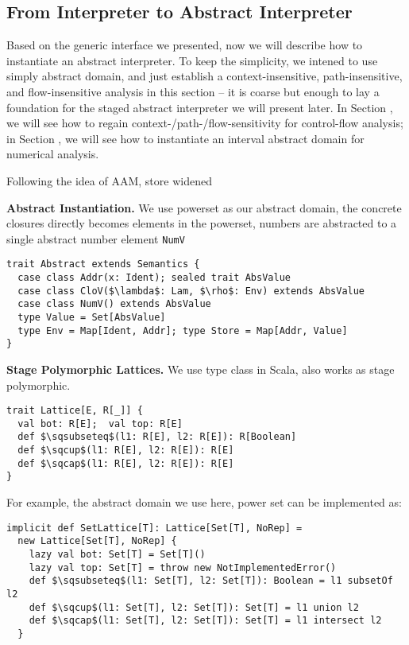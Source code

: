 \subsection{From Interpreter to Abstract Interpreter}

Based on the generic interface we presented, now we will describe how to instantiate an abstract interpreter.
To keep the simplicity, we intened to use simply abstract domain, and just establish a context-insensitive, 
path-insensitive, and flow-insensitive analysis in this section -- it is coarse but enough to lay a foundation for 
the staged abstract interpreter we will present later.
In Section , we will see how to regain 
context-/path-/flow-sensitivity for control-flow analysis; in Section , we will see how to 
instantiate an interval abstract domain for numerical analysis.

Following the idea of AAM, store widened

\textbf{Abstract Instantiation.}
We use powerset as our abstract domain, the concrete closures directly becomes elements in the powerset, numbers
are abstracted to a single abstract number element \texttt{NumV}

\begin{lstlisting}
trait Abstract extends Semantics {
  case class Addr(x: Ident); sealed trait AbsValue
  case class CloV($\lambda$: Lam, $\rho$: Env) extends AbsValue
  case class NumV() extends AbsValue
  type Value = Set[AbsValue]
  type Env = Map[Ident, Addr]; type Store = Map[Addr, Value]
}
\end{lstlisting}

\textbf{Stage Polymorphic Lattices.}
We use type class in Scala, also works as stage polymorphic.
\begin{lstlisting}
trait Lattice[E, R[_]] {
  val bot: R[E];  val top: R[E]
  def $\sqsubseteq$(l1: R[E], l2: R[E]): R[Boolean]
  def $\sqcup$(l1: R[E], l2: R[E]): R[E]
  def $\sqcap$(l1: R[E], l2: R[E]): R[E]
}
\end{lstlisting}

For example, the abstract domain we use here, power set can be implemented as:

\begin{lstlisting}
implicit def SetLattice[T]: Lattice[Set[T], NoRep] = 
  new Lattice[Set[T], NoRep] {
    lazy val bot: Set[T] = Set[T]()
    lazy val top: Set[T] = throw new NotImplementedError()
    def $\sqsubseteq$(l1: Set[T], l2: Set[T]): Boolean = l1 subsetOf l2
    def $\sqcup$(l1: Set[T], l2: Set[T]): Set[T] = l1 union l2
    def $\sqcap$(l1: Set[T], l2: Set[T]): Set[T] = l1 intersect l2
  }
\end{lstlisting}

